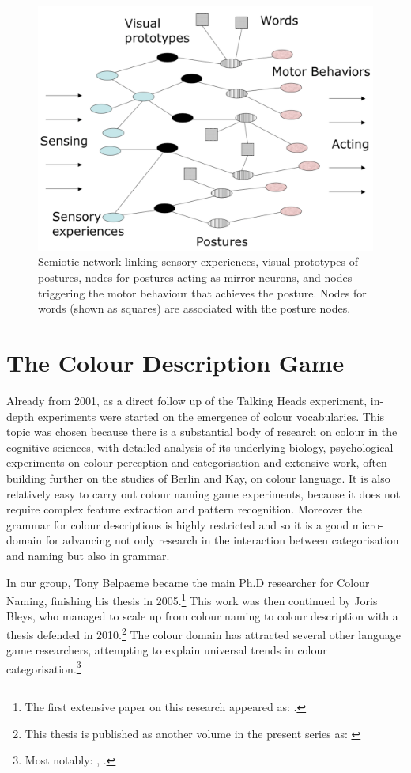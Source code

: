 \begin{figure}
\centerline{\includegraphics[width=0.6\linewidth]{chap11/figs/network.pdf}}
\caption{\label{network} Semiotic network linking sensory experiences, visual prototypes of postures, nodes for postures acting as mirror neurons, and nodes triggering the motor behaviour that achieves the posture. Nodes for words (shown as squares) 
are associated with the posture nodes.}
\end{figure}

\section{The Colour Description Game}

Already from 2001, as a direct follow up of the Talking Heads experiment, in-depth experiments were started on the emergence of 
colour vocabularies. This topic was chosen because 
there is a substantial body of research on colour in the cognitive sciences, with 
detailed analysis of its underlying biology, psychological experiments on colour perception and categorisation 
and extensive work, often building further on the studies of Berlin and Kay, on colour language. It is also 
relatively easy to carry out colour naming game experiments, because it does not require complex feature extraction 
and pattern recognition. Moreover the grammar for colour descriptions is highly restricted and so it is a good micro-domain for 
advancing not only research in the interaction between categorisation and naming but also in grammar. 

In our group, Tony Belpaeme became the main Ph.D researcher for Colour Naming, finishing his thesis 
in 2005.\footnote{The first extensive paper on this research appeared as: \cite{Steels:2005}.}
This work was then continued by Joris Bleys, who managed to scale up from colour naming to colour description with 
a thesis defended in 2010.\footnote{This thesis is published as another volume in the present series as: \cite{Bleys:2014}}
The colour domain has attracted several other language game researchers, attempting to explain 
universal trends in colour categorisation.\footnote{Most notably: \cite{Puglisi:2008}, \cite{Baronchelli:2010}.}


